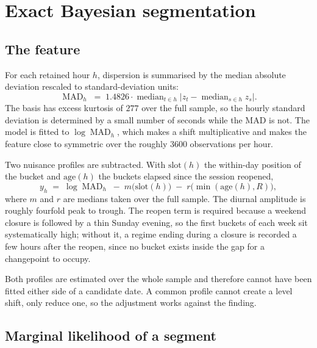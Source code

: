\documentclass[11pt,a4paper]{article}
\begin{document}
\section{Exact Bayesian segmentation}
\label{sec:cp}

\subsection{The feature}

For each retained hour $h$, dispersion is summarised by the median absolute deviation
rescaled to standard-deviation units:
\[
\operatorname{MAD}_h \;=\; 1.4826 \cdot \operatorname{median}_{t \in h}
\bigl| z_t - \operatorname{median}_{s \in h} z_s \bigr| .
\]
The basis has excess kurtosis of $277$ over the full sample, so the hourly standard
deviation is determined by a small number of seconds while the MAD is not. The model is
fitted to $\log \operatorname{MAD}_h$, which makes a shift multiplicative and makes the
feature close to symmetric over the roughly $3600$ observations per hour.

Two nuisance profiles are subtracted. With $\mathrm{slot}(h)$ the within-day position of the
bucket and $\mathrm{age}(h)$ the buckets elapsed since the session reopened,
\begin{equation}
y_h \;=\; \log \operatorname{MAD}_h \;-\; m\bigl(\mathrm{slot}(h)\bigr)
\;-\; r\bigl(\min(\mathrm{age}(h), R)\bigr),
\label{eq:deseason}
\end{equation}
where $m$ and $r$ are medians taken over the full sample. The diurnal amplitude is roughly
fourfold peak to trough. The reopen term is required because a weekend closure is followed
by a thin Sunday evening, so the first buckets of each week sit systematically high; without
it, a regime ending during a closure is recorded a few hours after the reopen, since no
bucket exists inside the gap for a changepoint to occupy.

Both profiles are estimated over the whole sample and therefore cannot have been fitted
either side of a candidate date. A common profile cannot create a level shift, only reduce
one, so the adjustment works against the finding.

\subsection{Marginal likelihood of a segment}
\end{document}
